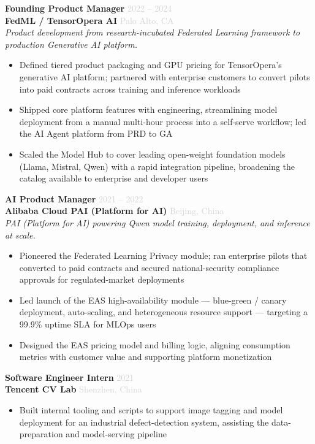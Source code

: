 \documentclass[11pt,a4paper]{article}
\newcommand{\resumeItem}[1]{\item #1}
\newcommand{\daterange}[1]{\hfill \textcolor{lightgray}{\small #1}}
\newcommand{\location}[1]{\hfill \textcolor{lightgray}{\small #1}}
\begin{document}
\textbf{Founding Product Manager} \daterange{2022 -- 2024}\\
\textbf{FedML / TensorOpera AI} \location{Palo Alto, CA}\\
\textit{Product development from research-incubated Federated Learning framework to production Generative AI platform.}
\begin{itemize}[leftmargin=*, nosep, itemsep=2pt]
    \resumeItem{Defined tiered product packaging and GPU pricing for TensorOpera's generative AI platform; partnered with enterprise customers to convert pilots into paid contracts across training and inference workloads}
    \resumeItem{Shipped core platform features with engineering, streamlining model deployment from a manual multi-hour process into a self-serve workflow; led the AI Agent platform from PRD to GA}
    \resumeItem{Scaled the Model Hub to cover leading open-weight foundation models (Llama, Mistral, Qwen) with a rapid integration pipeline, broadening the catalog available to enterprise and developer users}
\end{itemize}

\vspace{6pt}

\textbf{AI Product Manager} \daterange{2021 -- 2022}\\
\textbf{Alibaba Cloud PAI (Platform for AI)} \location{Beijing, China}\\
\textit{PAI (Platform for AI) powering Qwen model training, deployment, and inference at scale.}
\begin{itemize}[leftmargin=*, nosep, itemsep=2pt]
    \resumeItem{Pioneered the Federated Learning Privacy module; ran enterprise pilots that converted to paid contracts and secured national-security compliance approvals for regulated-market deployments}
    \resumeItem{Led launch of the EAS high-availability module --- blue-green / canary deployment, auto-scaling, and heterogeneous resource support --- targeting a 99.9\% uptime SLA for MLOps users}
    \resumeItem{Designed the EAS pricing model and billing logic, aligning consumption metrics with customer value and supporting platform monetization}
\end{itemize}

\vspace{6pt}

\textbf{Software Engineer Intern} \daterange{2021}\\
\textbf{Tencent CV Lab} \location{Shenzhen, China}
\begin{itemize}[leftmargin=*, nosep, itemsep=2pt]
    \resumeItem{Built internal tooling and scripts to support image tagging and model deployment for an industrial defect-detection system, assisting the data-preparation and model-serving pipeline}
\end{itemize}
\end{document}
